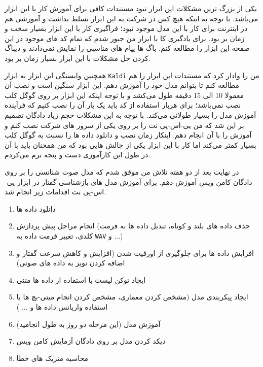 یکی از بزرگ ترین مشکلات این ابزار نبود مستندات کافی برای آموزش کار با این ابزار می‌باشد. با توجه به اینکه هیچ کس در شرکت به این ابزار تسلط نداشت و آموزشی هم در اینترنت برای کار با این مدل موجود نبود؛ فراگیری کار با این ابزار بسیار سخت و زمان بر بود.
برای یادگیری کا با ابزار من جبور شدم که تمام کد های موجود در این صفحه این ابزار را مطالعه کنم. باگ ها پیام های مناسبی را نمایش نمی‌دادند و دیباگ کردن حل مشکلات با این ابزار بسیار زمان بر بود.

همچنین وابستگی این ابزار به ابزار 
\verb|Kaldi|
من را وادار کرد که مستندات این ابزار را هم مطالعه کنم تا بتوانم مدل خود را آموزش دهم.
این ابزار سنگین است و نصب آن معمولا 10 الی 15 دقیقه طول می‌کشد و با توجه اینکه این ابزار بر روی
گوگل کلب
نصب نمی‌باشد؛ برای هربار استفاده از کد باید یک بار آن را نصب کنیم که فرآینده آموزش مدل را بسیار طولانی می‌کند.
با توجه به این مشکلات حجم زیاد دادگان تصمیم بر این شد که من
یی-اس-پی نت
را بر روی یکی از سرور های شرکت نصب کنم و آموزش را با آن انجام دهم.
اینکار زمان نصب و دانلود داده ها را نسبت به گوگل کلب بسیار کمتر می‌کند اما کار با این ابزار یکی از چالش هایی بود که من همچنان باید با آن در طول این کارآموزی دست و پنجه نرم می‌کردم.

در نهایت بعد از دو هفته تلاش من موفق شدم که مدل صوت شنانسی را بر روی دادگان کامن ویس
آموزش دهم.
برای آموزش مدل های بازشناسی گفتار در ابزار
یی-اس-پی نت
اقدامات زیر انجام شد.

\begin{enumerate}

  \item دانلود داده ها

  \item انجام مراحل پیش پردازش (حذف داده های بلند و کوتاه، تبدیل داده ها به فرمت کلدی، تغییر فرمت داده به  \texttt{WAV} و ...)

  \item افزایش داده ها برای جلوگیری از اورفیت شدن (افزایش و کاهش سرعت گفتار و اضافه کردن نویز به داده های صوتی)

  \item ایجاد توکن لیست با استفاده از داده ها متنی

  \item ایجاد پیکربندی مدل (مشخص کردن معماری، مشخص کردن انجام مینی-بچ ها با استفاده واریانس داده ها و ... )

  \item آموزش مدل (این مرحله دو روز به طول انجامید)

  \item دیکد کردن مدل بر روی دادگان آزمایش کامن ویس

  \item محاسبه متریک های خطا

\end{enumerate}

